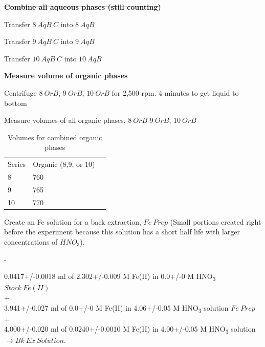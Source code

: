 \documentclass[idxtotoc,hyperref,openany,oneside]{labbook} %
\newcommand{\cmark}{\ding{51}}%
\newcommand{\done}{\rlap{$\square$}{\raisebox{2pt}{\large\hspace{1pt}\cmark}}%
  \hspace{-2.5pt}}
\newcommand{\tsbs}{\textsubscript}
\begin{document}
\textbf{\st{Combine all aqueous phases (still counting)}}
\begin{todolist}
\item{Transfer $\boxed{8\ AqB\ C}$ into $\boxed{8\ AqB}$}
\item{Transfer $\boxed{9\ AqB\ C}$ into $\boxed{9\ AqB}$}
\item{Transfer $\boxed{10\ AqB\ C}$ into $\boxed{10\ AqB}$}
\end{todolist}

\textbf{Measure volume of organic phases}
\begin{todolist}
\item[\done]{Centrifuge $\boxed{8\ OrB}$, $\boxed{9\ OrB}$,
  $\boxed{10\ OrB}$ for 2,500 rpm. 4 minutes to get liquid to
  bottom}
\item[\done]{Measure volumes of all organic phases, $\boxed{8\ OrB}$
     $\boxed{9\ OrB}$, $\boxed{10\ OrB}$}
\begin{table}[H]
  \begin{center}
    \caption{Volumes for combined organic phases}
    \begin{tabular}{l l l}
      \toprule
      Series & Organic (8,9, or 10)\\ 
      8 & 760\\
      9 & 765\\
      10 & 770\\
      \bottomrule
    \end{tabular}
  \end{center}
\end{table}  
\end{todolist}

Create an Fe solution for a back extraction, $\boxed{Fe\ Prep}$
(Small portions created right before the experiment because this
solution has a short half life with larger concentrations of $HNO_3$).

\begin{todolist}
\item[\done]{-}
\end{todolist}
\begin{center}
0.0417+/-0.0018 ml of 2.302+/-0.009 M Fe(II) in 0.0+/-0 M HNO\tsbs{3} $\boxed{Stock\ Fe(II)}$\\
+\\
3.941+/-0.027 ml of 0.0+/-0 M Fe(II) in 4.06+/-0.05 M HNO\tsbs{3} solution $\boxed{Fe\ Prep}$\\
+\\
4.000+/-0.020 ml of 0.0240+/-0.0010 M Fe(II) in 4.00+/-0.05 M HNO\tsbs{3} solution $\boxed{\rightarrow Bk\ Ex\ Solution}$.
\end{center}
\end{document}
